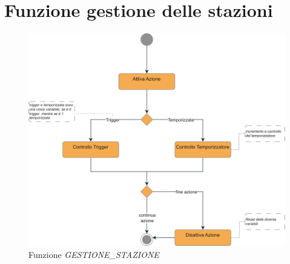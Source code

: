 \documentclass{article}
\begin{document}
\section{Funzione gestione delle stazioni}
\begin{figure}[t]
    \centering
    \includegraphics[width = 1 \linewidth]{Diagrammi/TestoStrutturato-funzione.png}
    \caption{Funzione \textit{GESTIONE\_STAZIONE}}
    \label{fig:funzione}
\end{figure}
\end{document}

